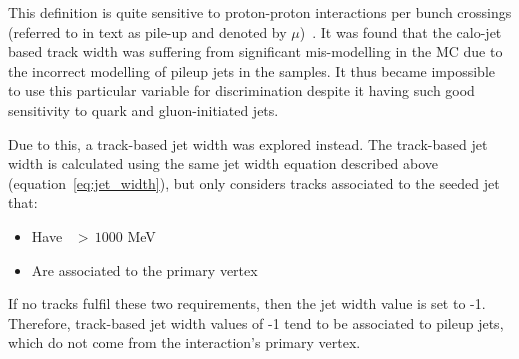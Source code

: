 	This definition is quite sensitive to proton-proton interactions per bunch crossings (referred to in text as pile-up and denoted by $\mu$)~\cite{Aad_2012}. 
	It was found that the calo-jet based track width was suffering from significant mis-modelling in the MC due to the incorrect modelling of pileup jets in the samples.
	 It thus became impossible to use this particular variable for discrimination despite it having such good sensitivity to quark and gluon-initiated jets. 
	
	Due to this, a track-based jet width was explored instead. 
	The track-based jet width is calculated using the same jet width equation described above (equation~\ref{eq:jet_width}), but only considers tracks associated to the seeded jet that: 
	\begin{itemize}
		\item Have \pt\ $>\,1000$ MeV
		\item Are associated to the primary vertex 
	\end{itemize}
	 If no tracks fulfil these two requirements, then the jet width value is set to -1. Therefore, track-based jet width values of -1 tend to be associated to pileup jets, which do not come from the interaction's primary vertex.

